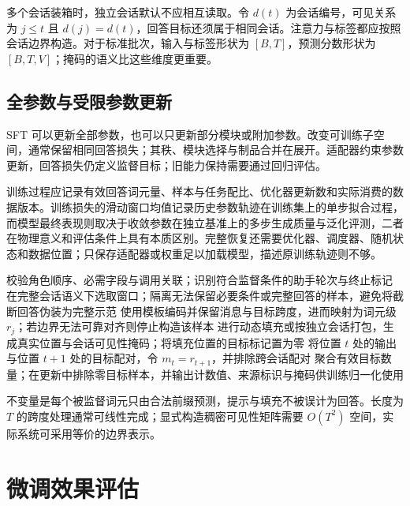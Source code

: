 \documentclass[../textbook.tex]{subfiles}
\begin{document}
多个会话装箱时，独立会话默认不应相互读取。令 $d(t)$ 为会话编号，可见关系为 $j\le t$ 且 $d(j)=d(t)$，回答目标还须属于相同会话。注意力与标签都应按照会话边界构造。对于标准批次，输入与标签形状为 $[B,T]$，预测分数形状为 $[B,T,V]$；掩码的语义比这些维度更重要。

\subsection{全参数与受限参数更新}
SFT 可以更新全部参数，也可以只更新部分模块或附加参数。改变可训练子空间，通常保留相同回答损失；其秩、模块选择与制品合并在展开。适配器约束参数更新，回答损失仍定义监督目标；旧能力保持需要通过回归评估。

训练过程应记录有效回答词元量、样本与任务配比、优化器更新数和实际消费的数据版本。训练损失的滑动窗口均值记录历史参数轨迹在训练集上的单步拟合过程，而模型最终表现则取决于收敛参数在独立基准上的多步生成质量与泛化评测，二者在物理意义和评估条件上具有本质区别。完整恢复还需要优化器、调度器、随机状态和数据位置；只保存适配器或权重足以加载模型，描述原训练轨迹则不够。

\begin{algorithm}[由会话构造条件监督批次]
\begin{myalgorithmic}[1]
\State 校验角色顺序、必需字段与调用关联；识别符合监督条件的助手轮次与终止标记
\State 在完整会话语义下选取窗口；隔离无法保留必要条件或完整回答的样本，避免将截断回答伪装为完整示范
\State 使用模板编码并保留消息与目标跨度，进而映射为词元级 $r_j$；若边界无法可靠对齐则停止构造该样本
\State 进行动态填充或按独立会话打包，生成真实位置与会话可见性掩码；将填充位置的目标标记置为零
\State 将位置 $t$ 处的输出与位置 $t+1$ 处的目标配对，令 $m_t=r_{t+1}$，并排除跨会话配对
\State 聚合有效目标数量；在更新中排除零目标样本，并输出计数值、来源标识与掩码供训练归一化使用
\end{myalgorithmic}
不变量是每个被监督词元只由合法前缀预测，提示与填充不被误计为回答。长度为 $T$ 的跨度处理通常可线性完成；显式构造稠密可见性矩阵需要 $O(T^2)$ 空间，实际系统可采用等价的边界表示。
\end{algorithm}

\section{微调效果评估}
\end{document}
